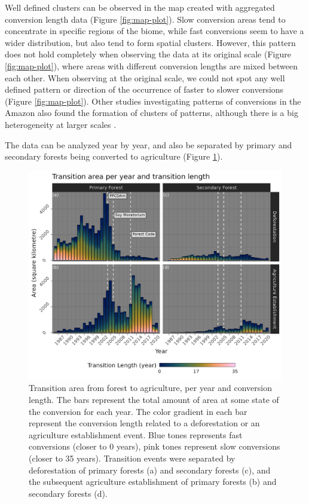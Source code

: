 \documentclass[essd, manuscript]{copernicus}
\begin{document}
Well defined clusters can be observed in the map created with aggregated conversion length data (Figure \ref{fig:map-plot}).
Slow conversion areas tend to concentrate in specific regions of the biome, while fast conversions seem to have a wider distribution, but also tend to form spatial clusters.
However, this pattern does not hold completely when observing the data at its original scale (Figure \ref{fig:map-plot}), where areas with different conversion lengths are mixed between each other.
When observing at the original scale, we could not spot any well defined pattern or direction of the occurrence of faster to slower conversions (Figure \ref{fig:map-plot}).
Other studies investigating patterns of conversions in the Amazon also found the formation of clusters of patterns, although there is a big heterogeneity at larger scales \citep{MullerHansen2017}.

The data can be analyzed year by year, and also be separated by primary and secondary forests being converted to agriculture (Figure \ref{fig:transbar-plot}).

\begin{figure}[h]
\includegraphics[width=17cm]{figs/trans_length_cols} \caption{Transition area from forest to agriculture, per year and conversion length. The bars represent the total amount of area at some state of the conversion for each year. The color gradient in each bar represent the conversion length related to a deforestation or an agriculture establishment event. Blue tones represents fast conversions (closer to 0 years), pink tones represent slow conversions (closer to 35 years). Transition events were separated by deforestation of primary forests (a) and secondary forests (c), and the subsequent agriculture establishment of primary forests (b) and secondary forests (d).}\label{fig:transbar-plot}
\end{figure}
\end{document}
